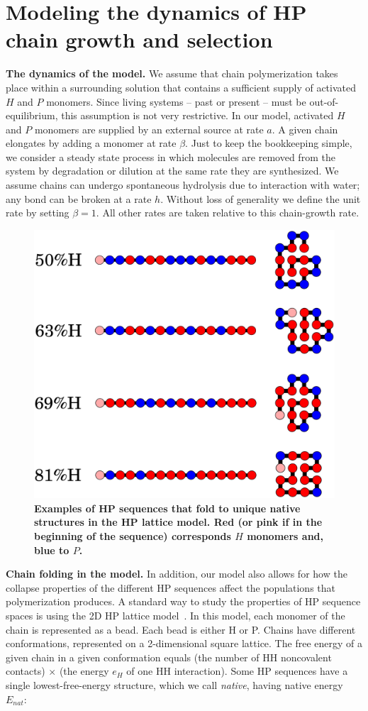\documentclass[5p,times]{elsarticle}
\begin{document}
\section{Modeling the dynamics of HP chain growth and selection}
 
 \textbf{The dynamics of the model.}  We assume that chain polymerization takes place within a 
surrounding solution that contains a sufficient supply of activated $H$ and $P$ monomers.  Since 
living systems -- past or present -- must be out-of-equilibrium, this 
assumption is not very restrictive.  In our model, activated $H$ and $P$ monomers are supplied by 
an external source at rate $a$.  A given chain elongates by adding a monomer at rate $\beta$.  Just 
to keep the bookkeeping simple, we consider a steady state process in which molecules are removed 
from the system by degradation or dilution at the same rate they are 
synthesized.  We assume chains can undergo spontaneous hydrolysis due to interaction with water; 
any bond can be broken at a rate $h$. Without loss of generality we define the unit rate by 
setting 
$\beta = 1$.  All other rates are taken relative to this chain-growth rate.
 
 \begin{figure}[h!]
  \centering
  \includegraphics[width=0.8\columnwidth]{pictures/tst-seqs.pdf} 
  \caption{\footnotesize{\bf{Examples of HP sequences that fold to unique native structures in the 
HP lattice model.} Red (or pink if in the beginning of the sequence) corresponds $H$ monomers and, 
blue to $P$.}}
  \label{fig:hydro-effect}
\end{figure}
 \textbf{Chain folding in the model.}  In addition, our model also allows for how the collapse 
properties of the different HP sequences affect the populations that polymerization produces.  A 
standard way to study the properties of HP sequence spaces is using the 2D HP lattice 
model~\cite{lau1989lattice,Chan1991}.  In this model, each monomer of the chain is represented as 
a 
bead.  Each bead is either H or P.  Chains have different conformations, represented on a 
2-dimensional square lattice.  The free energy of a given chain in a given conformation equals 
(the 
number of HH noncovalent contacts) $\times$ (the energy $e_H$ of one HH interaction).  Some HP 
sequences have a single lowest-free-energy structure, which we call \emph{native}, having native 
energy $E_{nat}$:
\end{document}
